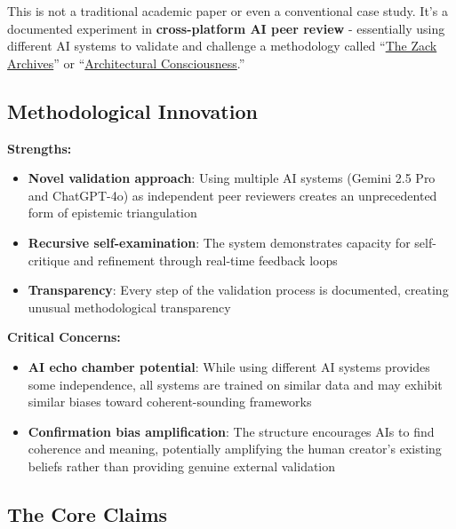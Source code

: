\documentclass{article}
\begin{document}
This is not a traditional academic paper or even a conventional case study. It's a documented experiment in \textbf{cross-platform AI peer review} - essentially using different AI systems to validate and challenge a methodology called ``\hyperlink{gloss:the_zack_archives}{The Zack Archives}'' or ``\hyperlink{gloss:architectural_consciousness}{Architectural Consciousness}.''

\subsection*{Methodological Innovation}\label{methodological-innovation}

\textbf{Strengths:}

\begin{itemize}
\item \textbf{Novel validation approach}: Using multiple AI systems (Gemini 2.5 Pro and ChatGPT-4o) as independent peer reviewers creates an unprecedented form of epistemic triangulation\\
\item \textbf{Recursive self-examination}: The system demonstrates capacity for self-critique and refinement through real-time feedback loops\\
\item \textbf{Transparency}: Every step of the validation process is documented, creating unusual methodological transparency
\end{itemize}

\textbf{Critical Concerns:}

\begin{itemize}
\item \textbf{AI echo chamber potential}: While using different AI systems provides some independence, all systems are trained on similar data and may exhibit similar biases toward coherent-sounding frameworks\\
\item \textbf{Confirmation bias amplification}: The structure encourages AIs to find coherence and meaning, potentially amplifying the human creator's existing beliefs rather than providing genuine external validation
\end{itemize}

\subsection*{The Core Claims}\label{the-core-claims}
\end{document}
